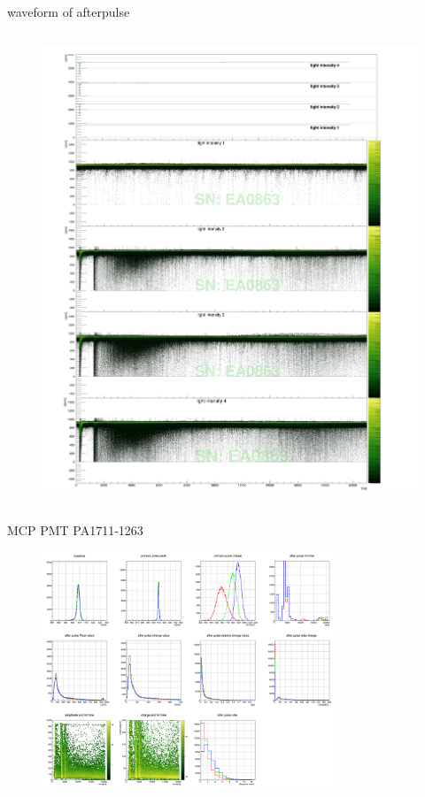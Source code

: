 \documentclass[11pt,compress,xcolor=x11names,UTF8]{beamer}
\begin{document}
\begin{frame}{waveform of afterpulse}
\begin{columns}
\begin{column}{.485\textwidth}
\begin{figure}
\includegraphics[width=1.049\textwidth]{figure/EA0863_avewave.png} %
\end{figure}
\end{column}
\end{columns}
\end{frame}
\begin{frame}{MCP PMT PA1711-1263 }
\vspace{-.4cm}
\begin{figure}
\centering
	\includegraphics[width=0.79\textwidth]{figure/PA1711-1263_apstats}
\end{figure}
\end{frame}
\end{document}
